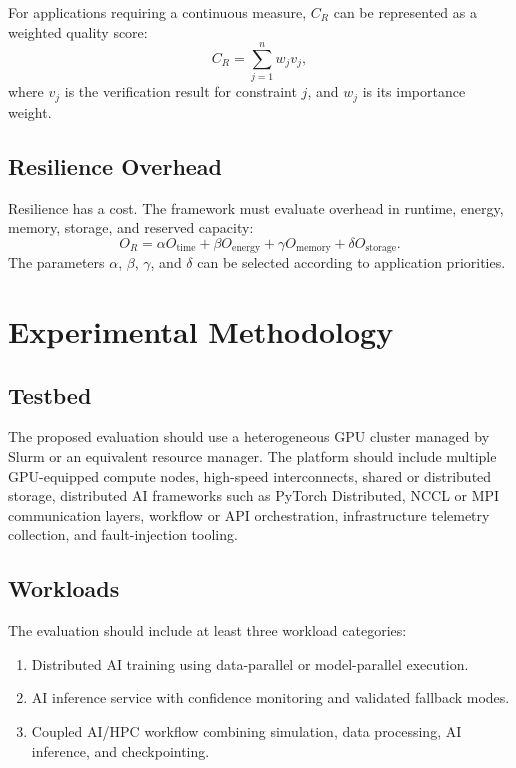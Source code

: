 \documentclass[conference]{IEEEtran}
\begin{document}
For applications requiring a continuous measure, $C_R$ can be represented as a weighted quality score:
\begin{equation}
C_R = \sum_{j=1}^{n} w_jv_j,
\end{equation}
where $v_j$ is the verification result for constraint $j$, and $w_j$ is its importance weight.

\subsection{Resilience Overhead}

Resilience has a cost. The framework must evaluate overhead in runtime, energy, memory, storage, and reserved capacity:
\begin{equation}
O_R = \alpha O_{\mathrm{time}} + \beta O_{\mathrm{energy}} + \gamma O_{\mathrm{memory}} + \delta O_{\mathrm{storage}}.
\end{equation}
The parameters $\alpha$, $\beta$, $\gamma$, and $\delta$ can be selected according to application priorities.

\section{Experimental Methodology}

\subsection{Testbed}

The proposed evaluation should use a heterogeneous GPU cluster managed by Slurm or an equivalent resource manager. The platform should include multiple GPU-equipped compute nodes, high-speed interconnects, shared or distributed storage, distributed AI frameworks such as PyTorch Distributed, NCCL or MPI communication layers, workflow or API orchestration, infrastructure telemetry collection, and fault-injection tooling.

\subsection{Workloads}

The evaluation should include at least three workload categories:
\begin{enumerate}
    \item Distributed AI training using data-parallel or model-parallel execution.
    \item AI inference service with confidence monitoring and validated fallback modes.
    \item Coupled AI/HPC workflow combining simulation, data processing, AI inference, and checkpointing.
\end{enumerate}
\end{document}
